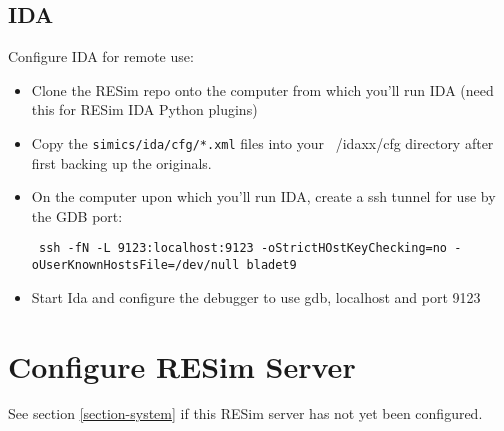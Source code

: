 \documentclass[titlepage]{article}
\begin{document}
\subsection{IDA}
Configure IDA for remote use:
\begin{itemize}
\item Clone the RESim repo onto the computer from which you'll run IDA (need this for RESim
IDA Python plugins)

\item Copy the {\tt simics/ida/cfg/*.xml} files into your ~/idaxx/cfg directory after first
backing up the originals.

\item On the computer upon which you'll run IDA, create a ssh tunnel for use by the GDB port:
\begin{verbatim}
 ssh -fN -L 9123:localhost:9123 -oStrictHOstKeyChecking=no -oUserKnownHostsFile=/dev/null bladet9
\end{verbatim}

\item Start Ida and configure the debugger to use gdb, localhost and port 9123
\end{itemize}

\section{Configure RESim Server}
See section \ref{section-system} if this RESim server has not yet been configured.
\end{document}
